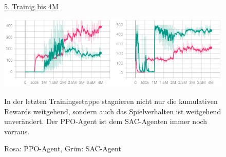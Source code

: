 \begin{figure} [h]
\underline{5. Trainig bis 4M} 

\includegraphics[width=\textwidth]{images/centered2_erg}
\label{unity_agent}
\caption{Rosa: PPO-Agent, Grün: SAC-Agent}

 
In der letzten Trainingsetappe stagnieren nicht nur die kumulativen Rewards weitgehend, sondern auch das Spielverhalten ist weitgehend unverändert. Der PPO-Agent ist dem SAC-Agenten immer noch vorraus. 
\end{figure}